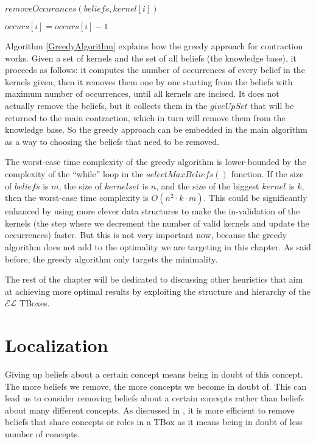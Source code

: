 \begin{algorithm}
\begin{algorithmic}[1]
\State $removeOccurances(beliefs, kernel[i])$
\EndFor
\EndFunction
\end{algorithmic}

\begin{algorithmic}[1]
\State $occurs[i] = occurs[i] - 1$
\EndIf
\EndFor
\EndFunction
\end{algorithmic}
\end{algorithm}

Algorithm \ref{GreedyAlgorithm} explains how the greedy approach for contraction works. Given a set of kernels and the set of all beliefs (the knowledge base), it proceeds as follows: it computes the number of occurrences of every belief in the kernels given, then it removes them one by one starting from the beliefs with maximum number of occurrences, until all kernels are incised. It does not actually remove the beliefs, but it collects them in the $giveUpSet$ that will be returned to the main contraction, which in turn will remove them from the knowledge base. So the greedy approach can be embedded in the main algorithm as a way to choosing the beliefs that need to be removed. 

The worst-case time complexity of the greedy algorithm is lower-bounded by the complexity of the ``while'' loop in the $selectMaxBeliefs()$ function. If the size of $beliefs$ is $m$, the size of $kernelset$ is $n$, and the size of the biggest $kernel$ is $k$, then the worst-case time complexity is $O(n^2 \cdot k \cdot m)$. This could be significantly enhanced by using more clever data structures to make the in-validation of the kernels (the step where we decrement the number of valid kernels and update the occurrences) faster. But this is not very important now, because the greedy algorithm does not add to the optimality we are targeting in this chapter. As said before, the greedy algorithm only targets the minimality.

The rest of the chapter will be dedicated to discussing other heuristics that aim at achieving more optimal results by exploiting the structure and hierarchy of the $\mathcal{EL}$ TBoxes.

\section{Localization}
Giving up beliefs about a certain concept means being in doubt of this concept. The more beliefs we remove, the more concepts we become in doubt of. This can lead us to consider removing beliefs about a certain concepts rather than beliefs about many different concepts. As discussed in \cite{zwei}, it is more efficient to remove beliefs that share concepts or roles in a TBox as it means being in doubt of less number of concepts.

